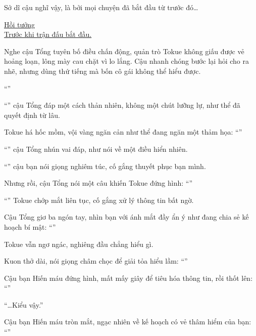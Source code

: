 \documentclass[../main.tex]{subfiles}
\begin{document}
Sở dĩ cậu nghĩ vậy, là bởi mọi chuyện đã bắt đầu từ trước đó\dots

\begin{center}
  \uline{Hồi tưởng\\Trước khi trận đấu bắt đầu.}
\end{center}

Nghe cậu Tổng tuyên bố điều chấn động, quản trò Tokue không giấu được vẻ hoảng loạn, lông mày cau chặt vì lo lắng. Cậu nhanh chóng bước lại hỏi cho ra nhẽ, nhưng dùng thứ tiếng mà bốn cô gái không thể hiểu được.

``''

``'' cậu Tổng đáp một cách thản nhiên, không một chút lưỡng lự, như thể đã quyết định từ lâu.

Tokue há hốc mồm, vội vàng ngăn cản như thể đang ngăn một thảm họa: ``''

``'' cậu Tổng nhún vai đáp, như nói về một điều hiển nhiên.

``'' cậu bạn nói giọng nghiêm túc, cố gắng thuyết phục bạn mình.

Nhưng rồi, cậu Tổng nói một câu khiến Tokue đứng hình: ``''

``'' Tokue chớp mắt liên tục, cố gắng xử lý thông tin bất ngờ.

Cậu Tổng giơ ba ngón tay, nhìn bạn với ánh mắt đầy ẩn ý như đang chia sẻ kế hoạch bí mật: ``''

Tokue vẫn ngơ ngác, nghiêng đầu chẳng hiểu gì.

Kuon thở dài, nói giọng châm chọc để giải tỏa hiểu lầm: ``''

Cậu bạn Hiến máu đứng hình, mất mấy giây để tiêu hóa thông tin, rồi thốt lên: ``''

``\dots Kiểu vậy.''

Cậu bạn Hiến máu tròn mắt, ngạc nhiên về kế hoạch có vẻ thâm hiểm của bạn: ``''
\end{document}
